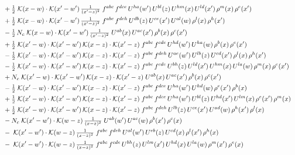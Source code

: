 \documentclass[10pt]{article}
\numberwithin{equation}{section}
\begin{document}
\begin{align}
&\quad +\tfrac{1}{2}\;\mathcal{K}(x-w)\cdot\mathcal{K}(x'-w')\,\tfrac{1}{(x'-z)^{2}}\;f^{abc}\,f^{dce}\,U^{ha}(w')\,U^{bl}(z)\,U^{hm}(x)\,U^{ld}(x')\,\rho^{m}(x)\,\rho^{e}(x')\notag\\
&\quad +\tfrac{1}{2}\;\mathcal{K}(x-w)\cdot\mathcal{K}(x'-w')\,\tfrac{1}{(x'-z)^{2}}\;f^{abc}\,f^{deh}\,U^{db}(z)\,U^{ce}(x')\,U^{al}(w)\,\rho^{l}(x)\,\rho^{h}(x')\notag\\
&\quad -\tfrac{1}{2}\,N_c\;\mathcal{K}(x-w)\cdot\mathcal{K}(x'-w')\,\tfrac{1}{(x'-z)^{2}}\;U^{ab}(x)\,U^{ac}(x')\,\rho^{b}(x)\,\rho^{c}(x')\notag\\
&\quad +\tfrac{1}{2}\;\mathcal{K}(x'-w)\cdot\mathcal{K}(x'-w')\,\mathcal{K}(x-z)\cdot\mathcal{K}(x'-z)\;f^{abc}\,f^{cde}\,U^{hd}(w')\,U^{ha}(w)\,\rho^{b}(x)\,\rho^{e}(x')\notag\\
&\quad -\tfrac{1}{2}\;\mathcal{K}(x'-w)\cdot\mathcal{K}(x'-w')\,\mathcal{K}(x-z)\cdot\mathcal{K}(x'-z)\;f^{abc}\,f^{deh}\,U^{ae}(w')\,U^{lb}(z)\,U^{cd}(x')\,\rho^{l}(x)\,\rho^{h}(x')\notag\\
&\quad -\tfrac{1}{2}\;\mathcal{K}(x'-w)\cdot\mathcal{K}(x'-w')\,\mathcal{K}(x-z)\cdot\mathcal{K}(x'-z)\;f^{abc}\,f^{cde}\,U^{bh}(z)\,U^{ld}(x')\,U^{hm}(x)\,U^{la}(w)\,\rho^{m}(x)\,\rho^{e}(x')\notag\\
&\quad +N_c\;\mathcal{K}(x'-w)\cdot\mathcal{K}(x'-w')\,\mathcal{K}(x-z)\cdot\mathcal{K}(x'-z)\;U^{ab}(x)\,U^{ac}(x')\,\rho^{b}(x)\,\rho^{c}(x')\notag\\
&\quad -\tfrac{1}{2}\;\mathcal{K}(x'-w)\cdot\mathcal{K}(x'-w')\,\mathcal{K}(x-z)\cdot\mathcal{K}(x'-z)\;f^{abc}\,f^{dce}\,U^{ha}(w')\,U^{hd}(w)\,\rho^{e}(x')\,\rho^{b}(x)\notag\\
&\quad +\tfrac{1}{2}\;\mathcal{K}(x'-w)\cdot\mathcal{K}(x'-w')\,\mathcal{K}(x-z)\cdot\mathcal{K}(x'-z)\;f^{abc}\,f^{dce}\,U^{ha}(w')\,U^{bl}(z)\,U^{hd}(x')\,U^{lm}(x)\,\rho^{e}(x')\,\rho^{m}(x)\notag\\
&\quad +\tfrac{1}{2}\;\mathcal{K}(x'-w)\cdot\mathcal{K}(x'-w')\,\mathcal{K}(x-z)\cdot\mathcal{K}(x'-z)\;f^{abc}\,f^{deh}\,U^{lb}(z)\,U^{ce}(x')\,U^{ad}(w)\,\rho^{h}(x')\,\rho^{l}(x)\notag\\
&\quad -N_c\;\mathcal{K}(x'-w')\cdot\mathcal{K}(w-z)\,\tfrac{1}{(x-z)^{2}}\;U^{ab}(w')\,U^{ac}(w)\,\rho^{b}(x')\,\rho^{c}(x)\notag\\
&\quad -\;\mathcal{K}(x'-w')\cdot\mathcal{K}(w-z)\,\tfrac{1}{(x-z)^{2}}\;f^{abc}\,f^{deh}\,U^{al}(w')\,U^{eb}(z)\,U^{cd}(x)\,\rho^{l}(x')\,\rho^{h}(x)\notag\\
&\quad -\;\mathcal{K}(x'-w')\cdot\mathcal{K}(w-z)\,\tfrac{1}{(x-z)^{2}}\;f^{abc}\,f^{cde}\,U^{bh}(z)\,U^{lm}(x')\,U^{hd}(x)\,U^{la}(w)\,\rho^{m}(x')\,\rho^{e}(x)\notag\\

\end{align}
\end{document}
